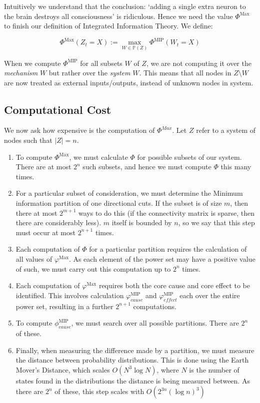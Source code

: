 Intuitively we understand that the conclusion: `adding a single extra neuron to the brain destroys all consciousness' is ridiculous. Hence we need the value $\Phi^{\text{Max}}$ to finish our definition of Integrated Information Theory. We define:

\begin{equation}
\label{def:Phimax}
\Phi^{\text{Max}}(Z_t = X) := \max \limits_{W \in \mathbb{P}(Z)}\Phi^{\text{MIP}} (W_t = X)
\end{equation}

\begin{remark}
	When we compute $\Phi^{\text{MIP}} $ for all subsets $W$ of $Z$, we are not computing it over the \textit{mechanism} $W$ but rather over the \textit{system} $W$. This means that all nodes in $Z \setminus W$ are now treated as external inputs/outputs, instead of unknown nodes in system.
\end{remark}

\subsection{Computational Cost}
We now ask how expensive is the computation of $\Phi^{Max}$. Let $Z$ refer to a system of nodes such that $|Z| = n$.

\begin{enumerate}
	\item To compute $\Phi^{\text{Max}}$, we must calculate $\Phi$ for possible subsets of our system. There are at most $2^n$ such subsets, and hence we must compute $\Phi$ this many times.
	\item For a particular subset of consideration, we must determine the Minimum information partition of one directional cuts. If the subset is of size $m$, then there at most $2^{m+1}$ ways to do this (if the connectivity matrix is sparse, then there are considerably less). $m$ itself is bounded by $n$, so we say that this step must occur at most $2^{n+1}$ times.
	\item Each computation of $\Phi$ for a particular partition requires the calculation of all values of $\varphi^{\text{Max}}$. As each element of the power set may have a positive value of such, we must carry out this computation up to $2^n$ times.
	\item Each computation of $\varphi^{\text{Max}}$ requires both the core cause and core effect to be identified. This involves calculation $\varphi^{\text{MIP}}_{cause}$ and $\varphi^{\text{MIP}}_{effect}$ each over the entire power set, resulting in a further $2^{n+1}$ computations.  
	\item To compute $\phi_{cause}^{\text{MIP}}$, we must search over all possible partitions. There are $2^n$ of these.
	\item Finally, when measuring the difference made by a partition, we must measure the distance between probability distributions. This is done using the Earth Mover's Distance, which scales $O(N^3 \log N)$, where $N$ is the number of states found in the distributions the distance is being measured between. As there are $2^n$ of these, this step scales with $O(2^{3n} (\log n)^3)$
\end{enumerate}

